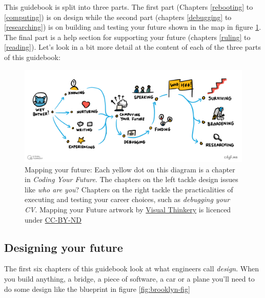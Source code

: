 \documentclass[
]{book}
\begin{document}
This guidebook is split into three parts. The first part (Chapters \ref{rebooting} to \ref{computing}) is on design while the second part (chapters \ref{debugging} to \ref{researching}) is on building and testing your future shown in the map in figure \ref{fig:map-fig}. The final part is a help section for supporting your future (chapters \ref{ruling} to \ref{reading}). Let's look in a bit more detail at the content of each of the three parts of this guidebook:

\begin{figure}

{\centering \includegraphics[width=1\linewidth]{images/Course Map V2} 

}

\caption{Mapping your future: Each yellow dot on this diagram is a chapter in \emph{Coding Your Future}. The chapters on the left tackle design issues like \emph{who are you}? Chapters on the right tackle the practicalities of executing and testing your career choices, such as \emph{debugging your CV}. Mapping your Future artwork by \href{https://visualthinkery.com/}{Visual Thinkery} is licenced under \href{https://creativecommons.org/licenses/by-nd/4.0/}{CC-BY-ND}}\label{fig:map-fig}
\end{figure}



\hypertarget{parti}{%
\subsection{Designing your future}\label{parti}}

The first six chapters of this guidebook look at what engineers call \emph{design}. When you build anything, a bridge, a piece of software, a car or a plane you'll need to do some design like the blueprint in figure \ref{fig:brooklyn-fig}
\end{document}
